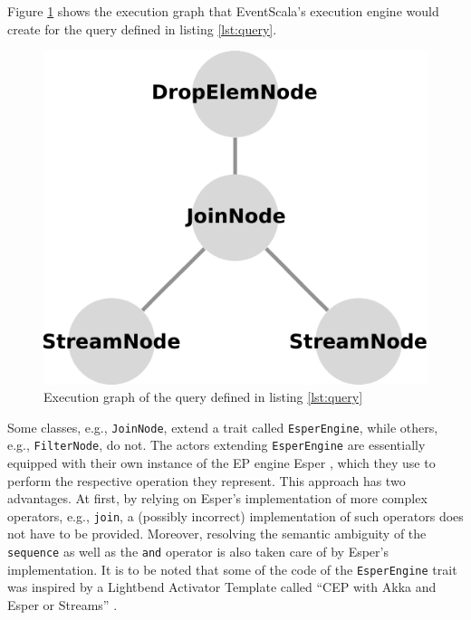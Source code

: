 \documentclass[article, 10pt, type=bsc, colorback, accentcolor=tud8b, parskip=half, bibliography=totocnumbered]{tudthesis}
\begin{document}
Figure \ref{fig:graph} shows the execution graph that EventScala's execution engine would create for the query defined in listing \ref{lst:query}.

\begin{figure}
\caption{Execution graph of the query defined in listing \ref{lst:query}}
\label{fig:graph}
\includegraphics[scale=0.7]{images/graph.pdf}
\centering
\end{figure}

Some classes, e.g., \lstinline{JoinNode}, extend a trait called \lstinline{EsperEngine}, while others, e.g., \lstinline{FilterNode}, do not.
The actors extending \lstinline{EsperEngine} are essentially equipped with their own instance of the EP engine Esper \cite{esper}, which they use to perform the respective operation they represent.
This approach has two advantages.
At first, by relying on Esper's implementation of more complex operators, e.g., \lstinline{join}, a (possibly incorrect) implementation of such operators does not have to be provided.
Moreover, resolving the semantic ambiguity of the \lstinline{sequence} as well as the \lstinline{and} operator is also taken care of by Esper's implementation.
It is to be noted that some of the code of the \lstinline{EsperEngine} trait was inspired by a Lightbend Activator Template called ``CEP with Akka and Esper or Streams'' \cite{akkacep}.
\end{document}
